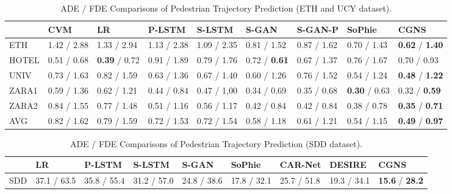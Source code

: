 \documentclass[letterpaper, 10 pt, conference]{ieeeconf}
\begin{document}
\begin{table*}[!tbp]
	\small
	\label{tab:feature}
	\caption{ADE / FDE Comparisons of Pedestrian Trajectory Prediction (ETH and UCY dataset).}
	\vspace{-0.5cm}
	\begin{center}
		\begin{tabular}{m{1.2cm}<{\centering}| m{1.5cm}<{\centering}| m{1.5cm}<{\centering}| m{1.5cm}<{\centering}| m{1.5cm}<{\centering}| m{1.5cm}<{\centering}| m{1.5cm}<{\centering}| m{1.5cm}<{\centering}| m{1.5cm}<{\centering} }
			\toprule
			\midrule
			&  CVM & LR & P-LSTM & S-LSTM & S-GAN & S-GAN-P  & SoPhie  & \textbf{CGNS}\\ \midrule 
			ETH   & 1.42 / 2.88 &  1.33 / 2.94 & 1.13 / 2.38 & 1.09 / 2.35 & 0.81 / 1.52 & 0.87 / 1.62 & 0.70 / 1.43 & \textbf{0.62} / \textbf{1.40} \\ 
			HOTEL & 0.51 / 0.68 &  \textbf{0.39} / 0.72 & 0.91 / 1.89 & 0.79 / 1.76 & 0.72 / \textbf{0.61} & 0.67 / 1.37 & 0.76 / 1.67 & 0.70 / 0.93 \\ 
			UNIV  & 0.73 / 1.63 &  0.82 / 1.59 & 0.63 / 1.36 & 0.67 / 1.40 & 0.60 / 1.26 & 0.76 / 1.52 & 0.54 / 1.24 & \textbf{0.48} / \textbf{1.22}\\ 
			ZARA1 & 0.59 / 1.36 &  0.62 / 1.21 & 0.44 / 0.84 & 0.47 / 1,00 & 0.34 / 0.69 & 0.35 / 0.68 & \textbf{0.30} / 0.63 & 0.32 / \textbf{0.59} \\
			ZARA2 & 0.84 / 1.55 &  0.77 / 1.48 & 0.51 / 1.16 & 0.56 / 1.17 & 0.42 / 0.84 & 0.42 / 0.84 & 0.38 / 0.78 & \textbf{0.35} / \textbf{0.71} \\
			\midrule
			AVG   & 0.82 / 1.62 &  0.79 / 1.59 & 0.72 / 1.53 & 0.72 / 1.54 & 0.58 / 1.18 & 0.61 / 1.21 & 0.54 / 1.15 & \textbf{0.49} / \textbf{0.97} \\   
			\bottomrule
		\end{tabular}
	\end{center}
	\vspace{-0.4cm}
\end{table*}
\begin{table*}[!tbp]
	\small
	\label{tab:feature}
	\caption{ADE / FDE Comparisons of Pedestrian Trajectory Prediction (SDD dataset).}
	\vspace{-0.5cm}
	\begin{center}
		\begin{tabular}{m{1.2cm}<{\centering}| m{1.5cm}<{\centering}| m{1.5cm}<{\centering}| m{1.5cm}<{\centering}| m{1.5cm}<{\centering}| m{1.5cm}<{\centering}| m{1.5cm}<{\centering}| m{1.5cm}<{\centering}| m{1.5cm}<{\centering} }
			\toprule
			\midrule
			& LR & P-LSTM & S-LSTM & S-GAN  & SoPhie & CAR-Net & DESIRE & \textbf{CGNS}\\ \midrule
			SDD     & 37.1 / 63.5 & 35.8 / 55.4 & 31.2 / 57.0 & 24.8 / 38.6 & 17.8 / 32.1 & 25.7 / 51.8 & 19.3 / 34.1 & \textbf{15.6} / \textbf{28.2}\\   
			\bottomrule
		\end{tabular}
	\end{center}
	\vspace{-0.4cm}
\end{table*}
\end{document}
